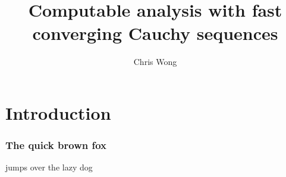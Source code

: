 \documentclass{beamer}
\begin{document}
\title{Computable analysis with fast converging Cauchy sequences}
\author{Chris Wong}

\frame{\titlepage}

\section{Introduction}
\begin{frame}
    \frametitle{The quick brown fox}
    \begin{Theorem}
        jumps over the lazy dog
    \end{Theorem}
\end{frame}
\end{document}
